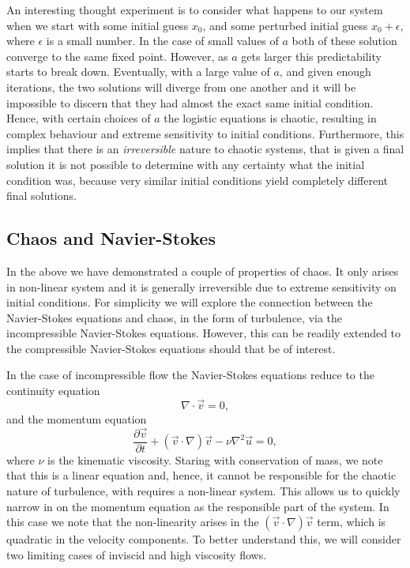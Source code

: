 An interesting thought experiment is to consider what happens to our system when we start with some initial guess $x_0$, and some perturbed initial guess $x_0 + \epsilon$, where $\epsilon$ is a small number. In the case of small values of $a$ both of these solution converge to the same fixed point. However, as $a$ gets larger this predictability starts to break down. Eventually, with a large value of $a$, and given enough iterations, the two solutions will diverge from one another and it will be impossible to discern that they had almost the exact same initial condition. Hence, with certain choices of $a$ the logistic equations is chaotic, resulting in complex behaviour and extreme sensitivity to initial conditions. Furthermore, this implies that there is an {\it irreversible} nature to chaotic systems, that is given a final solution it is not possible to determine with any certainty what the initial condition was, because very similar initial conditions yield completely different final solutions.

\subsection{Chaos and Navier-Stokes}
In the above we have demonstrated a couple of properties of chaos. It only arises in non-linear system and it is generally irreversible due to extreme sensitivity on initial conditions. For simplicity we will explore the connection between the Navier-Stokes equations and chaos, in the form of turbulence, via the incompressible Navier-Stokes equations. However, this can be readily extended to the compressible Navier-Stokes equations should that be of interest.

In the case of incompressible flow the Navier-Stokes equations reduce to the continuity equation
\begin{equation}
	\nabla \cdot \vec{v} = 0,
\end{equation}
and the momentum equation
\begin{equation}
	\frac{\partial \vec{v}}{\partial t} + \left(\vec{v} \cdot \nabla \right)\vec{v} - \nu \nabla^2 \vec{u} = 0,
\end{equation}
where $\nu$ is the kinematic viscosity. Staring with conservation of mass, we note that this is a linear equation and, hence, it cannot be responsible for the chaotic nature of turbulence, with requires a non-linear system. This allows us to quickly narrow in on the momentum equation as the responsible part of the system. In this case we note that the non-linearity arises in the $\left(\vec{v} \cdot \nabla \right)\vec{v}$ term, which is quadratic in the velocity components. To better understand this, we will consider two limiting cases of inviscid and high viscosity flows.

